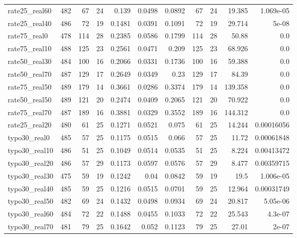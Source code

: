 \documentclass[11pt]{article}
\begin{document}
\begin{table}[H]
\begin{adjustbox}{max width=\textwidth}
\begin{tabular}{lrrrrrrrrrr}
rate25\_real60 & 482 & 67 & 24 & 0.139 & 0.0498 & 0.0892 & 67 & 24 & 19.385 & 1.069e-05 \\
rate25\_real40 & 486 & 72 & 19 & 0.1481 & 0.0391 & 0.1091 & 72 & 19 & 29.714 & 5e-08 \\
rate75\_real0 & 478 & 114 & 28 & 0.2385 & 0.0586 & 0.1799 & 114 & 28 & 50.88 & 0.0 \\
rate75\_real10 & 488 & 125 & 23 & 0.2561 & 0.0471 & 0.209 & 125 & 23 & 68.926 & 0.0 \\
rate50\_real30 & 484 & 100 & 16 & 0.2066 & 0.0331 & 0.1736 & 100 & 16 & 59.388 & 0.0 \\
rate50\_real70 & 487 & 129 & 17 & 0.2649 & 0.0349 & 0.23 & 129 & 17 & 84.39 & 0.0 \\
rate75\_real50 & 489 & 179 & 14 & 0.3661 & 0.0286 & 0.3374 & 179 & 14 & 139.358 & 0.0 \\
rate50\_real50 & 489 & 121 & 20 & 0.2474 & 0.0409 & 0.2065 & 121 & 20 & 70.922 & 0.0 \\
rate75\_real70 & 487 & 189 & 16 & 0.3881 & 0.0329 & 0.3552 & 189 & 16 & 144.312 & 0.0 \\
rate25\_real20 & 480 & 61 & 25 & 0.1271 & 0.0521 & 0.075 & 61 & 25 & 14.244 & 0.00016056 \\
typo30\_real0 & 485 & 57 & 25 & 0.1175 & 0.0515 & 0.066 & 57 & 25 & 11.72 & 0.00061848 \\
typo30\_real10 & 486 & 51 & 25 & 0.1049 & 0.0514 & 0.0535 & 51 & 25 & 8.224 & 0.00413472 \\
typo30\_real20 & 486 & 57 & 29 & 0.1173 & 0.0597 & 0.0576 & 57 & 29 & 8.477 & 0.00359715 \\
typo30\_real30 & 475 & 59 & 19 & 0.1242 & 0.04 & 0.0842 & 59 & 19 & 19.5 & 1.006e-05 \\
typo30\_real40 & 485 & 59 & 25 & 0.1216 & 0.0515 & 0.0701 & 59 & 25 & 12.964 & 0.00031749 \\
typo30\_real50 & 482 & 69 & 24 & 0.1432 & 0.0498 & 0.0934 & 69 & 24 & 20.817 & 5.05e-06 \\
typo30\_real60 & 484 & 72 & 22 & 0.1488 & 0.0455 & 0.1033 & 72 & 22 & 25.543 & 4.3e-07 \\
typo30\_real70 & 481 & 79 & 25 & 0.1642 & 0.052 & 0.1123 & 79 & 25 & 27.01 & 2e-07 \\
\bottomrule
\end{tabular}
\end{adjustbox}
\end{table}
\end{document}
